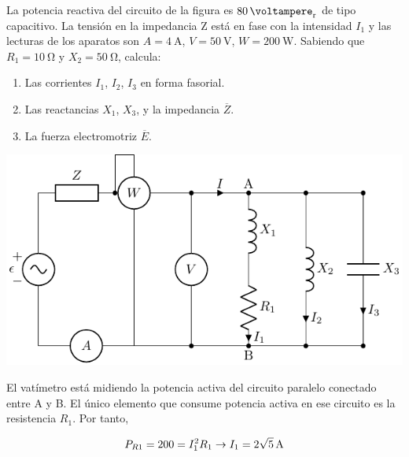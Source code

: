 \documentclass[12pt]{article}
\begin{document}

La potencia reactiva del circuito de la figura es $\SI{80}{\voltampere_r}$ de tipo capacitivo. La tensión en la impedancia Z está en fase con la intensidad $I_1$ y las lecturas de los aparatos son $A = \SI{4}{\ampere}$, $V = \SI{50}{\volt}$, $W = \SI{200}{\watt}$. Sabiendo que $R_1 = \SI{10}{\ohm}$ y $X_2 = \SI{50}{\ohm}$, calcula:

\begin{enumerate}
\item Las corrientes $I_1$, $I_2$, $I_3$ en forma fasorial.
\item Las reactancias $X_1$, $X_3$, y la impedancia $\overline{Z}$.
\item La fuerza electromotriz $\overline{E}$.
\end{enumerate}
\begin{center}
  \includegraphics{figs/problema12}
\end{center}

El vatímetro está midiendo la potencia activa del circuito paralelo conectado entre A y B. El único elemento que consume potencia activa en ese circuito es la resistencia $R_1$. Por tanto,

\[
  P_{R1} = 200 = I_1^2 R_1 \rightarrow I_1 = \SI[parse-numbers=false]{2\sqrt{5}}{\ampere}
\]
\end{document}
